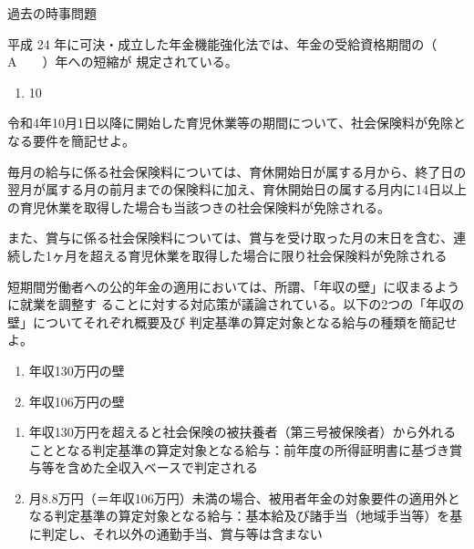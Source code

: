 \begin{explanationbox}
  過去の時事問題
\end{explanationbox}

\begin{fillblank}[年金1 H28 問題1(2)J]
  平成 24 年に可決・成立した年金機能強化法では、年金の受給資格期間の（　　A　　）年への短縮が
規定されている。
\end{fillblank}

\begin{answerbox}
  \begin{enumerate}[A: ]
    \item 10
  \end{enumerate}
\end{answerbox}

\begin{shortanswer}[数理人試験 2024 問題3 設問3]
  令和4年10月1日以降に開始した育児休業等の期間について、社会保険料が免除となる要件を簡記せよ。
\end{shortanswer}

\begin{answerbox}
  毎月の給与に係る社会保険料については、育休開始日が属する月から、終了日の翌月が属する月の前月までの保険料に加え、育休開始日の属する月内に14日以上の育児休業を取得した場合も当該つきの社会保険料が免除される。

また、賞与に係る社会保険料については、賞与を受け取った月の末日を含む、連続した1ヶ月を超える育児休業を取得した場合に限り社会保険料が免除される
\end{answerbox}

\begin{shortanswer}
  短期間労働者への公的年金の適用においては、所謂、「年収の壁」に収まるように就業を調整す
ることに対する対応策が議論されている。以下の2つの「年収の壁」についてそれぞれ概要及び
判定基準の算定対象となる給与の種類を簡記せよ。
\begin{enumerate}[(1)]
  \item 年収130万円の壁
  \item 年収106万円の壁
\end{enumerate}
\end{shortanswer}

\begin{answerbox}
  \begin{enumerate}[(1)]
  \item 年収130万円を超えると社会保険の被扶養者（第三号被保険者）から外れることとなる判定基準の算定対象となる給与：前年度の所得証明書に基づき賞与等を含めた全収入ベースで判定される
  \item 月8.8万円（＝年収106万円）未満の場合、被用者年金の対象要件の適用外となる判定基準の算定対象となる給与：基本給及び諸手当（地域手当等）を基に判定し、それ以外の通勤手当、賞与等は含まない
\end{enumerate}
\end{answerbox}

